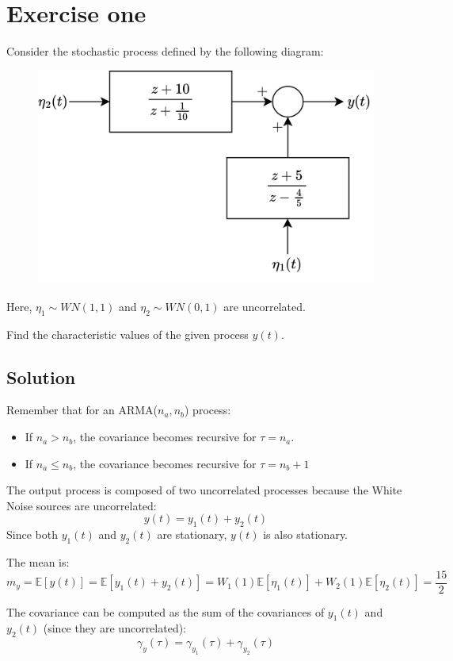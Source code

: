 \section{Exercise one}

Consider the stochastic process defined by the following diagram:
\begin{figure}[H]
    \centering
    \includegraphics[width=0.5\linewidth]{images/block.png}
\end{figure}
Here, $\eta_1 \sim WN(1,1)$ and $\eta_2 \sim WN(0,1)$ are uncorrelated. 

Find the characteristic values of the given process $y(t)$.

\subsection*{Solution}
Remember that for an ARMA($n_a,n_b$) process:
\begin{itemize}
    \item If $n_a>n_b$, the covariance becomes recursive for $\tau=n_a$.
    \item If $n_a \leq n_b$, the covariance becomes recursive for $\tau=n_b+1$
\end{itemize}

The output process is composed of two uncorrelated processes because the  White Noise sources are uncorrelated:
\[y(t)=y_1(t)+y_2(t)\]
Since both $y_1(t)$ and $y_2(t)$ are stationary, $y(t)$ is also stationary.

The mean is: 
\[m_y=\mathbb{E}\left[y(t)\right]=\mathbb{E}\left[y_1(t)+y_2(t)\right]=W_1(1)\mathbb{E}\left[\eta_1(t)\right]+W_2(1)\mathbb{E}\left[\eta_2(t)\right]=\dfrac{15}{2}\]

The covariance can be computed as the sum of the covariances of $y_1(t)$ and $y_2(t)$ (since they are uncorrelated):
\[\gamma_y(\tau)=\gamma_{y_1}(\tau)+\gamma_{y_2}(\tau)\]

